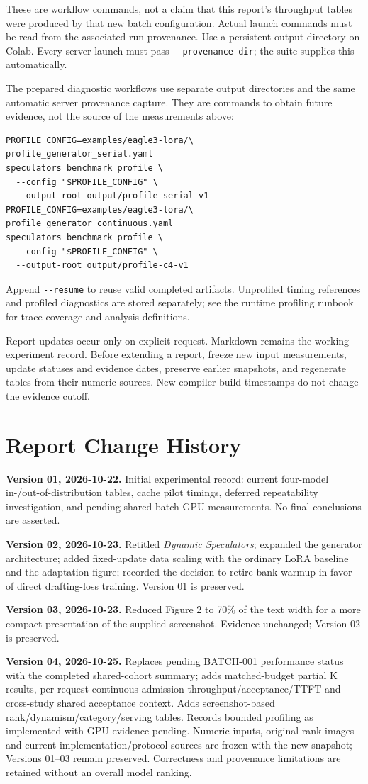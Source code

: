 These are workflow commands, not a claim that this report's throughput tables
were produced by that new batch configuration. Actual launch commands must be
read from the associated run provenance. Use a persistent output directory on
Colab. Every server launch must pass \verb|--provenance-dir|; the suite supplies
this automatically.

The prepared diagnostic workflows use separate output directories and the same
automatic server provenance capture. They are commands to obtain future evidence,
not the source of the measurements above:
\begingroup\footnotesize
\begin{verbatim}
PROFILE_CONFIG=examples/eagle3-lora/\
profile_generator_serial.yaml
speculators benchmark profile \
  --config "$PROFILE_CONFIG" \
  --output-root output/profile-serial-v1
PROFILE_CONFIG=examples/eagle3-lora/\
profile_generator_continuous.yaml
speculators benchmark profile \
  --config "$PROFILE_CONFIG" \
  --output-root output/profile-c4-v1
\end{verbatim}
\endgroup
Append \verb|--resume| to reuse valid completed artifacts. Unprofiled timing
references and profiled diagnostics are stored separately; see the runtime
profiling runbook for trace coverage and analysis definitions.

Report updates occur only on explicit request. Markdown remains the working
experiment record. Before extending a report, freeze new input measurements,
update statuses and evidence dates, preserve earlier snapshots, and regenerate
tables from their numeric sources. New compiler build timestamps do not change
the evidence cutoff.

\section{Report Change History}
\textbf{Version 01, 2026-10-22.} Initial experimental record: current four-model
in-/out-of-distribution tables, cache pilot timings, deferred repeatability
investigation, and pending shared-batch GPU measurements. No final conclusions
are asserted.

\textbf{Version 02, 2026-10-23.} Retitled \emph{Dynamic Speculators}; expanded
the generator architecture; added fixed-update data scaling with the ordinary
LoRA baseline and the adaptation figure; recorded the decision to retire bank
warmup in favor of direct drafting-loss training. Version 01 is preserved.

\textbf{Version 03, 2026-10-23.} Reduced Figure 2 to 70\% of the text width
for a more compact presentation of the supplied screenshot. Evidence unchanged;
Version 02 is preserved.


\textbf{Version 04, 2026-10-25.} Replaces pending BATCH-001 performance status
with the completed shared-cohort summary; adds matched-budget partial K results,
per-request continuous-admission throughput/acceptance/TTFT and cross-study shared
acceptance context. Adds screenshot-based rank/dynamism/category/serving tables.
Records bounded profiling as implemented with GPU evidence pending. Numeric
inputs, original rank images and current implementation/protocol sources are
frozen with the new snapshot; Versions 01--03 remain preserved. Correctness and
provenance limitations are retained without an overall model ranking.
